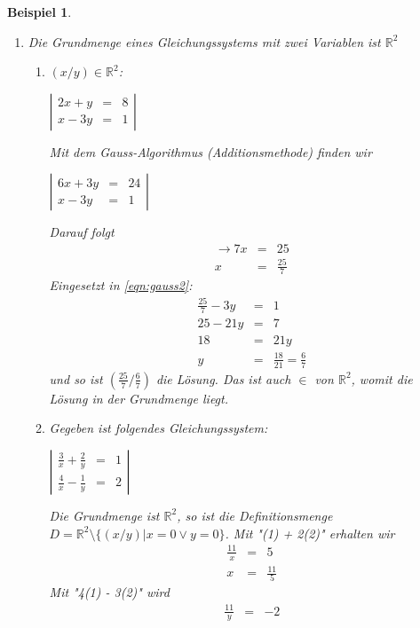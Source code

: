 \documentclass{report}
\newtheorem{myexample}{Beispiel}
\begin{document}
\begin{myexample}
\begin{enumerate}
so erhalten wir den \underline{zweidimensionalen Raum}.
\item Die Grundmenge eines Gleichungssystems mit zwei Variablen ist $\mathbb{R}^2$
\begin{enumerate}
\item $(x/y) \in \mathbb{R}^2$:
\begin{center}$\left|\begin{array}{rcr}
2x + y & = & 8\\
x -3y & = & 1\end{array}\right|$\end{center}
Mit dem Gauss-Algorithmus (Additionsmethode) finden wir
\begin{center}$\left|\begin{array}{rcr}
6x + 3y & = & 24 \\ x - 3y & = & 1 \label{eqn:gauss2} \end{array}\right|$\end{center}
Darauf folgt
\begin{eqnarray}\to 7x & = & 25 \nonumber \\
x & = & \frac{25}{7}\end{eqnarray}
Eingesetzt in \ref{eqn:gauss2}:
\begin{eqnarray}\frac{25}{7} - 3y & = & 1 \nonumber \\
25 - 21y & = & 7\nonumber \\
18 & = & 21y \nonumber \\
y & = & \frac{18}{21} = \frac{6}{7}\end{eqnarray}
und so ist $(\frac{25}{7} / \frac{6}{7})$ die Lösung. Das ist auch $\in$ von $\mathbb{R}^2$, womit die Lösung in der Grundmenge liegt.
\item Gegeben ist folgendes Gleichungssystem:
\begin{center}$\left|\begin{array}{rcr}\frac{3}{x} + \frac{2}{y} & = & 1 \\ \frac{4}{x} - \frac{1}{y} & = & 2\end{array}\right|$\end{center}
Die Grundmenge ist $\mathbb{R}^2$, so ist die Definitionsmenge \\$D = \mathbb{R}^2 \setminus \{(x/y) | x=0 \lor y=0\}$. Mit "(1) + 2(2)" erhalten wir
\begin{eqnarray}\frac{11}{x} & = & 5 \nonumber \\
x & = & \frac{11}{5}\end{eqnarray}
Mit "4(1) - 3(2)" wird
\begin{eqnarray}\frac{11}{y} & = & -2 \nonumber \\

\end{eqnarray}
\end{enumerate}
\end{enumerate}
\end{myexample}
\end{document}
